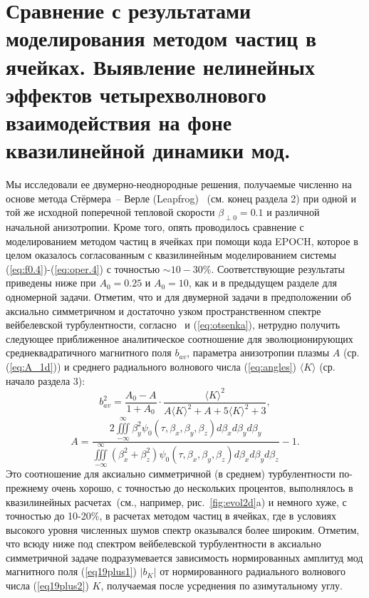 \section{Сравнение с результатами моделирования методом частиц в ячейках. Выявление нелинейных эффектов четырехволнового взаимодействия на фоне квазилинейной динамики мод.}\label{sec:ch2/sec1}
Мы исследовали ее двумерно-неоднородные решения, получаемые численно на основе метода Стёрмера~-- Верле (Leapfrog)~\cite{Birdsall2018} (см. конец раздела 2) при одной и той же исходной поперечной тепловой скорости $\beta_{\perp0}=0.1$ и различной начальной анизотропии. Кроме того, опять проводилось сравнение с моделированием методом частиц в ячейках при помощи кода EPOCH, которое в целом оказалось согласованным с квазилинейным моделированием системы (\ref{eq:f0.4})-(\ref{eq:oper.4}) с точностью $\sim10-30\%$. Соответствующие результаты приведены ниже при $A_0=0.25$ и $A_0=10$, как и в предыдущем разделе для одномерной задачи. Отметим, что и для двумерной задачи в предположении об аксиально симметричном и достаточно узком пространственном спектре вейбелевской турбулентности, согласно~\cite{Nechaev2023} и (\ref{eq:otsenka}), нетрудно получить следующее приближенное аналитическое соотношение для эволюционирующих среднеквадратичного магнитного поля $b_{av}$, параметра анизотропии плазмы $A$ (ср. (\ref{eq:A_1d})) и среднего радиального волнового числа (\ref{eq:angles}) $\langle K\rangle$ (ср. начало раздела 3): 
\begin{equation}
\label{eq:otsenka2d}
b_{av}^2 = \frac{A_0-A}{1+A_0}\cdot\dfrac{\langle K\rangle^2}{A \langle K\rangle^2+A+5\langle K\rangle^2+3} ,
\end{equation}
\begin{equation}
\label{eq:A_2d}
A=\frac{2\iiint\limits^{\infty}_{-\infty}\beta_y^2\psi_{0}(\tau,\beta_x,\beta_y,\beta_z) d\beta_x d\beta_yd\beta_y}{\iiint\limits^{\infty}_{-\infty}\left(\beta_x^2+\beta_z^2\right)\psi_{0}(\tau,\beta_x,\beta_y,\beta_z) d\beta_x d\beta_y d\beta_z}-1 .
\end{equation}
Это соотношение для аксиально симметричной (в среднем) турбулентности по-прежнему очень хорошо, с точностью до нескольких процентов, выполнялось в квазилинейных расчетах~(см., например, рис.~\ref{fig:evol2d}a) и немного хуже, с точностью до 10-20\%, в расчетах методом частиц в ячейках, где в условиях высокого уровня численных шумов спектр оказывался более широким. Отметим, что всюду ниже под спектром вейбелевской турбулентности в аксиально симметричной задаче подразумевается зависимость нормированных амплитуд мод магнитного поля (\ref{eq19plus1}) $|b_K|$ от нормированного радиального волнового числа (\ref{eq19plus2}) $K$, получаемая после усреднения по азимутальному углу. 
